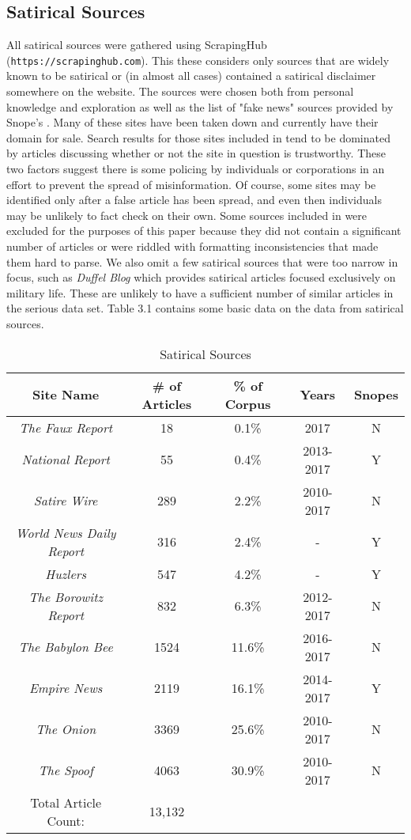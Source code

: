 \documentclass [12 pt] {report}
\begin{document}
\subsection{Satirical Sources}
All satirical sources were gathered using ScrapingHub (\texttt{https://scrapinghub.com}). This these considers only sources that are widely known to be satirical or (in almost all cases) contained a satirical disclaimer somewhere on the website. The sources were chosen both from personal knowledge and exploration as well as the list of "fake news" sources provided by Snope's \cite{LaCapria}. Many of these sites have been taken down and currently have their domain for sale. Search results for those sites included in \cite{LaCapria} tend to be dominated by articles discussing whether or not the site in question is trustworthy. These two factors suggest there is some policing by individuals or corporations in an effort to prevent the spread of misinformation. Of course, some sites may be identified only after a false article has been spread, and even then individuals may be unlikely to fact check on their own. Some sources included in \cite{LaCapria} were excluded for the purposes of this paper because they did not contain a significant number of articles or were riddled with formatting inconsistencies that made them hard to parse. We also omit a few satirical sources that were too narrow in focus, such as \textit{Duffel Blog} which provides satirical articles focused exclusively on military life. These are unlikely to have a sufficient number of similar articles in the serious data set. Table 3.1 contains some basic data on the data from satirical sources.

\begin{table}[h]
\caption{Satirical Sources}
\vspace{2mm}
\begin{tabular}{|c|c|c|c|c|}
\hline
Site Name & \# of Articles & \% of Corpus & Years & Snopes\\
\hline
\textit{The Faux Report} & 18 & 0.1\% & 2017 & N\\
\textit{National Report} & 55 & 0.4\% & 2013-2017 & Y\\
\textit{Satire Wire} & 289 & 2.2\%& 2010-2017 & N\\
\textit{World News Daily Report} & 316 & 2.4\% & - & Y\\
\textit{Huzlers} & 547 & 4.2\%& - & Y\\
\textit{The Borowitz Report} & 832 & 6.3\% & 2012-2017 & N\\
\textit{The Babylon Bee} & 1524 & 11.6\% & 2016-2017 & N\\
\textit{Empire News} & 2119 & 16.1\% &2014-2017 & Y\\
\textit{The Onion} & 3369 & 25.6\% &2010-2017 & N\\
\textit{The Spoof} & 4063 & 30.9\% & 2010-2017 & N\\
\hline\hline
Total Article Count: & 13,132&  & &\\
\hline
\end{tabular}
\label{table:satireSources}
\end{table}
\end{document}
